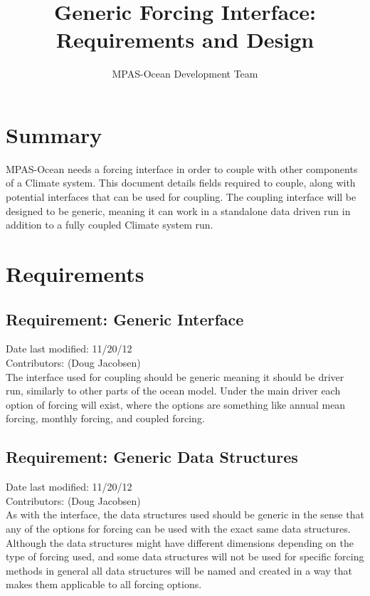 \documentclass[11pt]{report}
\begin{document}
\title{Generic Forcing Interface: \\
Requirements and Design}
\author{MPAS-Ocean Development Team}

\maketitle
\tableofcontents


\chapter{Summary}

MPAS-Ocean needs a forcing interface in order to couple with other components
of a Climate system. This document details fields required to couple, along
with potential interfaces that can be used for coupling. The coupling interface
will be designed to be generic, meaning it can work in a standalone data driven
run in addition to a fully coupled Climate system run.


\chapter{Requirements}

\section{Requirement: Generic Interface}
Date last modified: 11/20/12 \\
Contributors: (Doug Jacobsen) \\

The interface used for coupling should be generic meaning it should be driver
run, similarly to other parts of the ocean model. Under the main driver each
option of forcing will exist, where the options are something like annual mean
forcing, monthly forcing, and coupled forcing.

\section{Requirement: Generic Data Structures}
Date last modified: 11/20/12 \\
Contributors: (Doug Jacobsen) \\

As with the interface, the data structures used should be generic in the sense
that any of the options for forcing can be used with the exact same data
structures. Although the data structures might have different dimensions
depending on the type of forcing used, and some data structures will not be
used for specific forcing methods in general all data structures will be named
and created in a way that makes them applicable to all forcing options.
\end{document}
